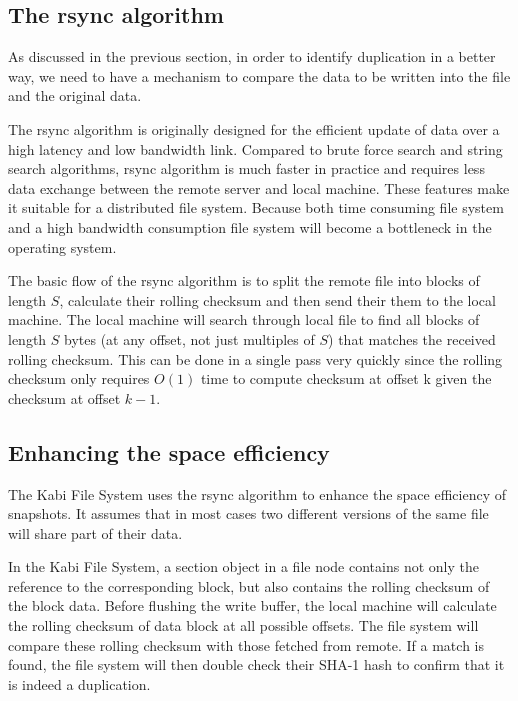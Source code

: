 \subsection{The rsync algorithm}

    As discussed in the previous section, in order to identify duplication in a better way, we need to have a mechanism to compare the data to be written into the file and the original data. 
    
    The rsync algorithm is originally designed for the efficient update of data over a high latency and low bandwidth link. Compared to brute force search and string search algorithms, rsync algorithm is much faster in practice and requires less data exchange between the remote server and local machine. These features make it suitable for a distributed file system. Because both time consuming file system and a high bandwidth consumption file system will become a bottleneck in the operating system.

    The basic flow of the rsync algorithm is to split the remote file into blocks of length $S$, calculate their rolling checksum and then send their them to the local machine. The local machine will search through local file to find all blocks of length $S$ bytes (at any offset, not just multiples of $S$) that matches the received rolling checksum. This can be done in a single pass very quickly since the rolling checksum only requires $O(1)$ time to compute checksum at offset k given the checksum at offset $k-1$.

\subsection{Enhancing the space efficiency}

    The Kabi File System uses the rsync algorithm to enhance the space efficiency of snapshots. It assumes that in most cases two different versions of the same file will share part of their data.

    In the Kabi File System, a section object in a file node contains not only the reference to the corresponding block, but also contains the rolling checksum of the block data. Before flushing the write buffer, the local machine will calculate the rolling checksum of data block at all possible offsets. The file system will compare these rolling checksum with those fetched from remote. If a match is found, the file system will then double check their SHA-1 hash to confirm that it is indeed a duplication.
    
